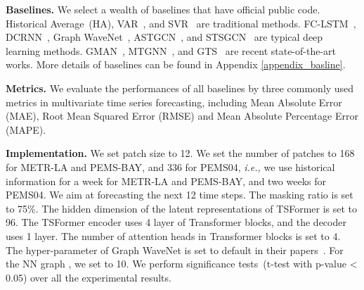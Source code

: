 \documentclass[sigconf]{acmart}
\newcommand{\ie}{\textit{i.e.,}\xspace}
\begin{document}
\begin{table}
\setlength{\abovecaptionskip}{0.cm}
\caption{Statistics of datasets.}
\label{tab:datasets}
  \vspace{-0.3cm}
\end{table} 
\noindent\textbf{Baselines.} We select a wealth of baselines that have official public code.
Historical Average~(HA), VAR~\cite{VAR}, and SVR~\cite{SVR} are traditional methods.
FC-LSTM~\cite{2014Seq2Seq}, DCRNN~\cite{2017DCRNN}, Graph WaveNet~\cite{GWNet}, ASTGCN~\cite{2019ASTGCN}, and STSGCN~\cite{2020STSGCN} are typical deep learning methods. GMAN~\cite{2020GMAN}, MTGNN~\cite{2020MTGNN}, and GTS~\cite{2021GTS} are recent state-of-the-art works.
More details of baselines can be found in Appendix \ref{appendix_basline}.

\noindent\textbf{Metrics.}
We evaluate the performances of all baselines by three commonly used metrics in multivariate time series forecasting, including Mean Absolute Error (MAE), Root Mean Squared Error (RMSE) and Mean Absolute Percentage Error (MAPE).

\noindent\textbf{Implementation.}
We set patch size  to 12.
We set the number of patches  to 168 for METR-LA and PEMS-BAY, and 336 for PEMS04, \ie we use historical information for a week for METR-LA and PEMS-BAY, and two weeks for PEMS04.
We aim at forecasting the next 12 time steps.
The masking ratio  is set to 75\%.
The hidden dimension of the latent representations of TSFormer  is set to 96.
The TSFormer encoder uses 4 layer of Transformer blocks, and the decoder uses 1 layer.
The number of attention heads in Transformer blocks is set to 4.
The hyper-parameter of Graph WaveNet is set to default in their papers~\cite{GWNet}.
For the NN graph , we set  to 10.
We perform significance tests~(t-test with p-value < 0.05) over all the experimental results.
\end{document}
